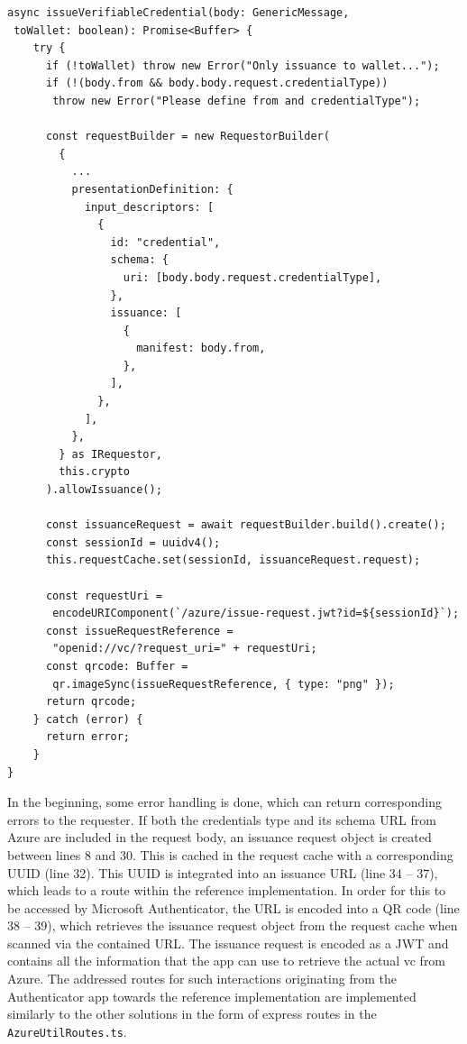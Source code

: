         \begin{lstlisting}[style=ES6, caption=Create a \ac{vc} issuance request with Azure, label={listing: azure issuance}]
async issueVerifiableCredential(body: GenericMessage, 
 toWallet: boolean): Promise<Buffer> {
    try {
      if (!toWallet) throw new Error("Only issuance to wallet...");
      if (!(body.from && body.body.request.credentialType)) 
       throw new Error("Please define from and credentialType");

      const requestBuilder = new RequestorBuilder(
        {
          ...
          presentationDefinition: {
            input_descriptors: [
              {
                id: "credential",
                schema: {
                  uri: [body.body.request.credentialType],
                },
                issuance: [
                  {
                    manifest: body.from,
                  },
                ],
              },
            ],
          },
        } as IRequestor,
        this.crypto
      ).allowIssuance();

      const issuanceRequest = await requestBuilder.build().create();
      const sessionId = uuidv4();
      this.requestCache.set(sessionId, issuanceRequest.request);

      const requestUri =
       encodeURIComponent(`/azure/issue-request.jwt?id=${sessionId}`);
      const issueRequestReference = 
       "openid://vc/?request_uri=" + requestUri;
      const qrcode: Buffer = 
       qr.imageSync(issueRequestReference, { type: "png" });
      return qrcode;
    } catch (error) {
      return error;
    }
}\end{lstlisting}
    
        In the beginning, some error handling is done, which can return corresponding errors to the requester. If both the credentials type and its schema URL from Azure are included in the request body, an issuance request object is created between lines 8 and 30. This is cached in the request cache with a corresponding UUID (line 32). This UUID is integrated into an issuance URL (line 34 – 37), which leads to a route within the reference implementation. In order for this to be accessed by Microsoft Authenticator, the URL is encoded into a QR code (line 38 – 39), which retrieves the issuance request object from the request cache when scanned via the contained URL. The issuance request is encoded as a JWT and contains all the information that the app can use to retrieve the actual \ac{vc} from Azure. The addressed routes for such interactions originating from the Authenticator app towards the reference implementation are implemented similarly to the other solutions in the form of express routes in the \texttt{AzureUtilRoutes.ts}.
        
